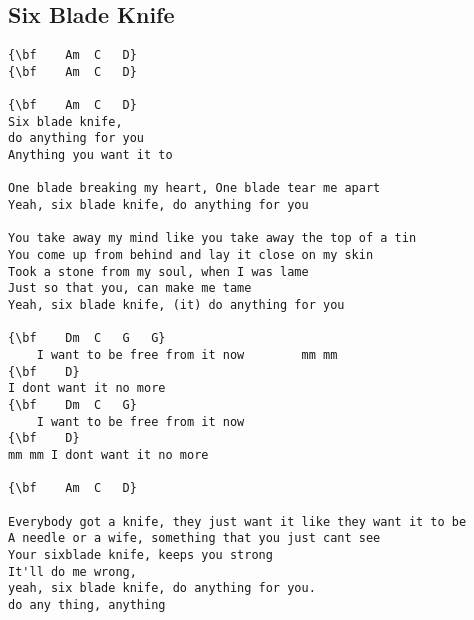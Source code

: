 \documentclass[a4paper]{article}
\begin{document}
\subsection{Six Blade Knife}
\begin{Verbatim}[commandchars=\\\{\}]
{\bf   	Am	C	D}
{\bf   	Am	C	D}

{\bf   	Am	C	D}
Six blade knife,	 
do anything for you	 
Anything you want it to

One blade breaking my heart, One blade tear me apart
Yeah, six blade knife, do anything for you

You take away my mind like you take away the top of a tin
You come up from behind and lay it close on my skin
Took a stone from my soul, when I was lame
Just so that you, can make me tame
Yeah, six blade knife, (it) do anything for you

{\bf   	Dm	C	G	G}
 	I want to be free from it now	   	 mm mm
{\bf   	D}
I dont want it no more
{\bf   	Dm	C	G}
 	I want to be free from it now	 
{\bf   	D}
mm mm I	dont want it no more

{\bf   	Am	C	D}

Everybody got a knife, they just want it like they want it to be
A needle or a wife, something that you just cant see
Your sixblade knife, keeps you strong
It'll do me wrong,
yeah, six blade knife, do anything for you.
do any thing, anything

\end{Verbatim}
\newpage
\end{document}
